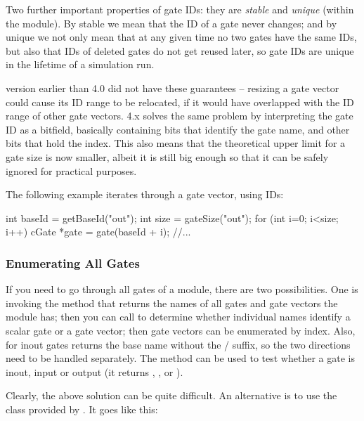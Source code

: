 Two further important properties of gate IDs: they are \textit{stable}
and \textit{unique} (within the module). By stable we mean that the ID
of a gate never changes; and by unique we not only mean that at any
given time no two gates have the same IDs, but also that IDs of deleted
gates do not get reused later, so gate IDs are unique in the lifetime
of a simulation run.

\begin{note}
    {\opp} version earlier than 4.0 did not have these guarantees -- resizing
    a gate vector could cause its ID range to be relocated, if it
    would have overlapped with the ID range of other gate vectors.
    {\opp} 4.x solves the same problem by interpreting the gate ID
    as a bitfield, basically containing bits that identify the gate name,
    and other bits that hold the index. This also means that the theoretical
    upper limit for a gate size is now smaller, albeit it is still
    big enough so that it can be safely ignored for practical purposes.
\end{note}

The following example iterates through a gate vector, using IDs:

\begin{cpp}
int baseId = getBaseId("out");
int size = gateSize("out");
for (int i=0; i<size; i++) {
    cGate *gate = gate(baseId + i);
    //...
}
\end{cpp}


\subsubsection{Enumerating All Gates}

If you need to go through all gates of a module, there are
two possibilities. One is invoking the  method
that returns the names of all gates and gate vectors the module
has; then you can call  to determine
whether individual names identify a scalar gate or a gate vector;
then gate vectors can be enumerated by index. Also, for inout
gates  returns the base name without the
/ suffix, so the two directions
need to be handled separately. The  method
can be used to test whether a gate is inout, input or output
(it returns , , or
).

Clearly, the above solution can be quite difficult. An alternative is to use
the  class provided by .
It goes like this:

